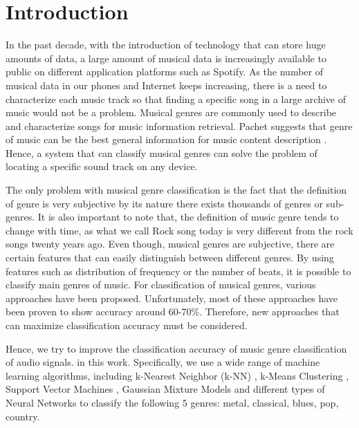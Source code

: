 \section{Introduction}
In the past decade, with the introduction of technology that can store huge amounts of data, a large amount of musical data is increasingly available to public on different application platforms such as Spotify. As the number of musical data in our phones and Internet keeps increasing, there is a need to characterize each music track so that finding a specific song in a large archive of music would not be a problem. Musical genres are commonly used to describe and characterize songs for music information retrieval. Pachet suggests that genre of music can be the best general information for music content description \cite{Pachet:2003}. Hence, a system that can classify musical genres can solve the problem of locating a specific sound track on any device. 

The only problem with musical genre classification is the fact that the definition of genre is very subjective by its nature there exists thousands of genres or sub-genres. It is also important to note that, the definition of music genre tends to change with time, as what we call Rock song today is very different from the rock songs twenty years ago. Even though, musical genres are subjective, there are certain features that can easily distinguish between different genres. By using features such as distribution of frequency or the number of beats, it is possible to classify main genres of music. For classification of musical genres, various approaches have been proposed. Unfortunately, most of these approaches have been proven to show accuracy around 60-70\%. Therefore, new approaches that can maximize classification accuracy must be considered.  

Hence, we try to improve the classification accuracy of music genre classification of audio signals. in this work. Specifically, we use a wide range of machine learning algorithms, including k-Nearest Neighbor (k-NN) \cite{KNN:2009}, k-Means Clustering \cite{Clustering:2001}, Support Vector Machines \cite{SVM:2006}, Gaussian Mixture Models \cite{Pachet:2003} and different types of Neural Networks to classify the following 5 genres: metal, classical, blues, pop, country. 

